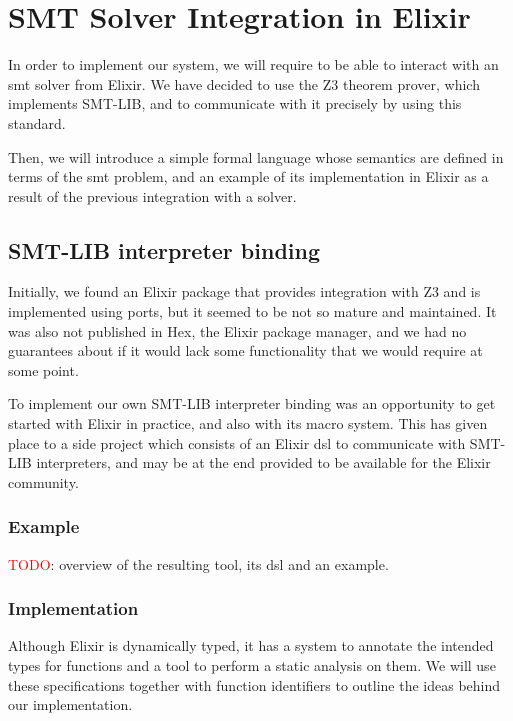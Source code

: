 \chapter{SMT Solver Integration in Elixir}
\label{cap:smtSolverIntegration}

In order to implement our system, we will require to be able to interact with
an \acrshort{smt} solver from Elixir. We have decided to use the Z3 theorem
prover, which implements SMT-LIB, and to communicate with it precisely by using
this standard.

Then, we will introduce a simple formal language whose semantics are defined
in terms of the \gls{smt} problem, and an example of its implementation in 
Elixir as a result of the previous integration with a solver.

\section{SMT-LIB interpreter binding}

Initially, we found an Elixir package that provides integration with Z3 and is
implemented using ports, but it seemed to be not so mature and maintained. It 
was also not published in Hex, the Elixir package manager, and we had no
guarantees about if it would lack some functionality that we would require at
some point.

To implement our own SMT-LIB interpreter binding was an opportunity to get
started with Elixir in practice, and also with its macro system. This has 
given place to a side project which consists of an Elixir \gls{dsl} to
communicate with SMT-LIB interpreters, and may be at the end provided to 
be available for the Elixir community.

\subsection{Example}
\label{integ:dslexample}

\textcolor{red}{TODO}: overview of the resulting tool, its \gls{dsl} and an example.

\subsection{Implementation}

Although Elixir is dynamically typed, it has a system to annotate the intended
types for functions and a tool to perform a static analysis on them. We will
use these specifications together with function identifiers to outline the ideas
behind our implementation.

